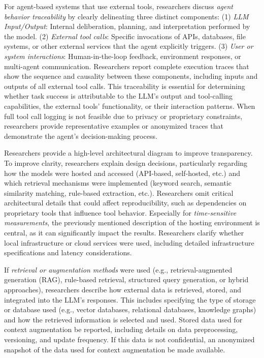 For agent-based systems that use external tools, researchers \must discuss \emph{agent behavior traceability} by clearly delineating three distinct components: (1) \emph{LLM Input/Output}: Internal deliberation, planning, and interpretation performed by the model. (2) \emph{External tool calls}: Specific invocations of APIs, databases, file systems, or other external services that the agent explicitly triggers. (3) \emph{User or system interactions}: Human-in-the-loop feedback, environment responses, or multi-agent communication.
Researchers \should report complete execution traces that show the sequence and causality between these components, including inputs and outputs of all external tool calls.
This traceability is essential for determining whether task success is attributable to the LLM's output and tool-calling capabilities, the external tools' functionality, or their interaction patterns.
When full tool call logging is not feasible due to privacy or proprietary constraints, researchers \should provide representative examples or anonymized traces that demonstrate the agent's decision-making process.

Researchers \should provide a high-level architectural diagram to improve transparency.
To improve clarity, researchers \should explain design decisions, particularly regarding how the models were hosted and accessed (API-based, self-hosted, etc.) and which retrieval mechanisms were implemented (keyword search, semantic similarity matching, rule-based extraction, etc.).
Researchers \mustnot omit critical architectural details that could affect reproducibility, such as dependencies on proprietary tools that influence tool behavior. 
Especially for \emph{time-sensitive measurements}, the previously mentioned description of the hosting environment is central, as it can significantly impact the results.
Researchers \must clarify whether local infrastructure or cloud services were used, including detailed infrastructure specifications and latency considerations.

If \emph{retrieval or augmentation methods} were used (e.g., retrieval-augmented generation (RAG), rule-based retrieval, structured query generation, or hybrid approaches), researchers \must describe how external data is retrieved, stored, and integrated into the LLM's responses.
This includes specifying the type of storage or database used (e.g., vector databases, relational databases, knowledge graphs) and how the retrieved information is selected and used.
Stored data used for context augmentation \must be reported, including details on data preprocessing, versioning, and update frequency.
If this data is not confidential, an anonymized snapshot of the data used for context augmentation \should be made available.

